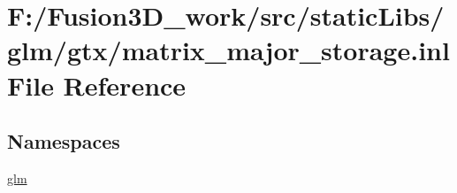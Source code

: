 \hypertarget{matrix__major__storage_8inl}{}\section{F\+:/\+Fusion3\+D\+\_\+work/src/static\+Libs/glm/gtx/matrix\+\_\+major\+\_\+storage.inl File Reference}
\label{matrix__major__storage_8inl}
\subsection*{Namespaces}
\begin{DoxyCompactItemize}
\item 
 \hyperlink{namespaceglm}{glm}
\end{DoxyCompactItemize}
